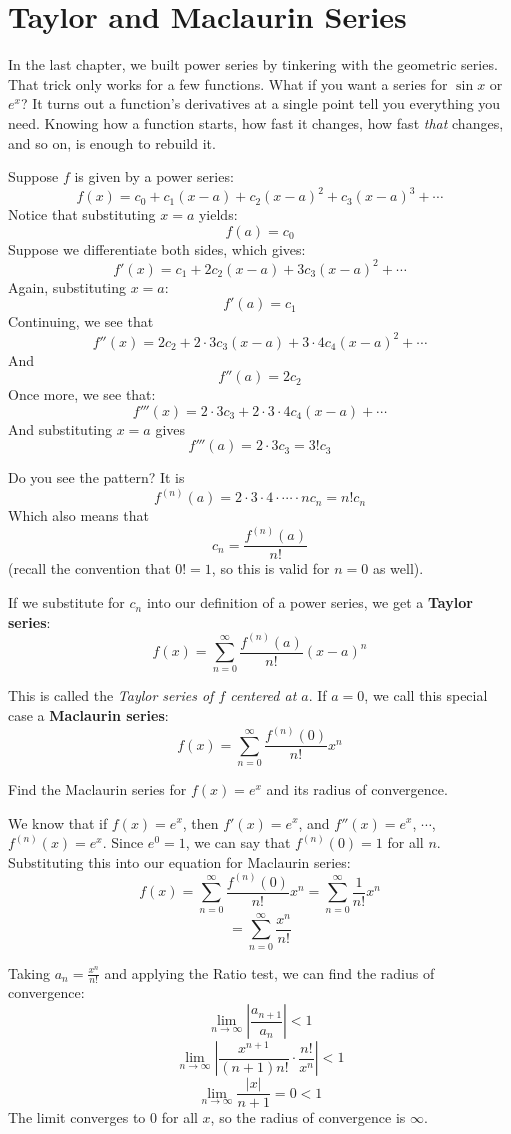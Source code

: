 \chapter{Taylor and Maclaurin Series}

In the last chapter, we built power series by tinkering with the geometric
series. That trick only works for a few functions. What if you want a series
for $\sin x$ or $e^x$? It turns out a function's derivatives at a single point
tell you everything you need. Knowing how a function starts, how fast it
changes, how fast \emph{that} changes, and so on, is enough to rebuild it.

Suppose $f$ is given by a power series:
$$f(x) = c_0 + c_1(x - a) + c_2(x - a)^2 + c_3(x - a)^3 + \cdots$$
Notice that substituting $x = a$ yields:
$$f(a) = c_0$$
Suppose we differentiate both sides, which gives:
$$f'(x) = c_1 + 2c_2(x - a) + 3c_3(x - a)^2 + \cdots$$
Again, substituting $x = a$:
$$f'(a) = c_1$$
Continuing, we see that
$$f''(x) = 2c_2 + 2 \cdot 3c_3(x-a) + 3 \cdot 4 c_4 (x-a)^2 + \cdots$$
And
$$f''(a) = 2c_2$$
Once more, we see that:
$$f'''(x) = 2 \cdot 3 c_3 + 2 \cdot 3 \cdot 4 c_4 (x-a) + \cdots$$
And substituting $x = a$ gives
$$f'''(a) = 2 \cdot 3 c_3 = 3!c_3$$

Do you see the pattern? It is 
$$f^{(n)}(a) = 2 \cdot 3 \cdot 4 \cdot \cdots \cdot nc_n = n!c_n$$
Which also means that 
$$c_n = \frac{f^{(n)}(a)}{n!}$$
(recall the convention that $0! = 1$, so this is valid for $n = 0$ as well). 

If we substitute for $c_n$ into our definition of a power series, we get a 
\textbf{Taylor series}:
$$f(x) = \sum_{n=0}^\infty \frac{f^{(n)}(a)}{n!} \left( x - a \right)^n$$

This is called the \textit{Taylor series of $f$ centered at $a$}. If $a = 0$, 
we call this special case a \textbf{Maclaurin series}:
$$f(x) = \sum_{n=0}^\infty \frac{f^{(n)}(0)}{n!}x^n$$

\begin{Worked}
\begin{Problem}
Find the Maclaurin series for $f(x) = e^x$ and its radius of 
convergence.
\end{Problem}
\begin{Solution}
We know that if $f(x) = e^x$, then $f'(x) = e^x$, and 
$f''(x) = e^x$, $\cdots$, $f^{(n)}(x) = e^x$. Since $e^0 = 1$, we can say that 
$f^{(n)}(0) = 1$ for all $n$. Substituting this into our equation for 
Maclaurin series:
$$f(x) = \sum_{n=0}^\infty \frac{f^{(n)}(0)}{n!}x^n = \sum_{n=0}^\infty 
\frac{1}{n!}x^n $$
$$= \sum_{n=0}^\infty \frac{x^n}{n!}$$

Taking $a_n = \frac{x^n}{n!}$ and applying the Ratio test, we can find the 
radius of convergence:
$$\lim_{n \to \infty} \left| \frac{a_{n + 1}}{a_n} \right| < 1$$
$$\lim_{n \to \infty} \left| \frac{x^{n + 1}}{(n+1)n!} \cdot \frac{n!}{x^n} 
\right| < 1$$
$$\lim_{n \to \infty} \frac{|x|}{n + 1} = 0 < 1$$
The limit converges to 0 for all $x$, so the radius of convergence is $\infty$.
\end{Solution}
\end{Worked}

